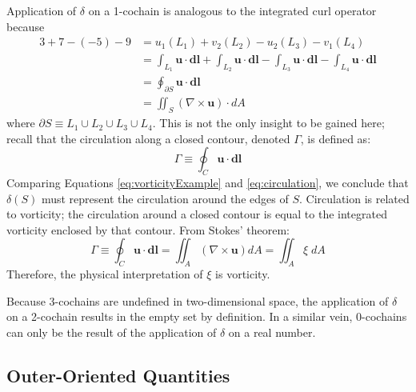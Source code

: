 Application of $\delta$ on a 1-cochain is analogous to the integrated curl operator because\begin{equation}
    \begin{split}
        3 + 7 - (-5) - 9 &= u_1(L_1) + v_2(L_2) - u_2(L_3) - v_1(L_4) \\
        &= \int_{L_1} \mathbf{u} \cdot \mathbf{dl} + \int_{L_2} \mathbf{u} \cdot \mathbf{dl} - \int_{L_3} \mathbf{u} \cdot \mathbf{dl} - \int_{L_4} \mathbf{u} \cdot \mathbf{dl} \\
        &= \oint_{\partial S} \mathbf{u} \cdot \mathbf{dl} \\
        &= \iint_{S} \left( \nabla \times \mathbf{u} \right) \cdot dA
    \end{split}
    \label{eq:vorticityExample}
\end{equation}
where $\partial S \equiv L_1 \cup L_2 \cup L_3 \cup L_4$. This is not the only insight to be gained here; recall that the circulation along a closed contour, denoted $\Gamma$, is defined as:
\begin{equation}
    \Gamma \equiv \oint_C \mathbf{u} \cdot \mathbf{dl}
    \label{eq:circulation}
\end{equation}
Comparing Equations \eqref{eq:vorticityExample} and \eqref{eq:circulation}, we conclude that $\delta(S)$ must represent the circulation around the edges of $S$. Circulation is related to vorticity; the circulation around a closed contour is equal to the integrated vorticity enclosed by that contour. From Stokes' theorem:
\begin{equation}
    \Gamma \equiv \oint_C \mathbf{u} \cdot \mathbf{dl} = \iint_A \left( \nabla \times \mathbf{u} \right) dA = \iint_A \xi \; dA
\end{equation}
Therefore, the physical interpretation of $\xi$ is vorticity.

Because $3$-cochains are undefined in two-dimensional space, the application of $\delta$ on a 2-cochain results in the empty set by definition. In a similar vein, 0-cochains can only be the result of the application of $\delta$ on a real number.

\subsection{Outer-Oriented Quantities}

